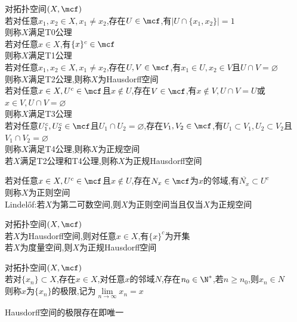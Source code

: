 \begin{dingyi}
对拓扑空间$(X,\mcf)$\\
若对任意$x_1,x_2\in X,x_1\neq x_2$,存在$U\in\mcf$,有$|U\cap\{x_1,x_2\}|=1$\\
则称$X$满足T0公理\\
若对任意$x\in X$,有$\{x\}^{c}\in\mcf$\\
则称$X$满足T1公理\\
若对任意$x_1,x_2\in X,x_1\neq x_2$,存在$U,V\in\mcf$,有$x_1\in U,x_2\in V$且$U\cap V=\varnothing$\\
则称$X$满足T2公理,则称$X$为Hausdorff空间\\
若对任意$x\in X,U^{c}\in\mcf$且$x\notin U$,存在$V\in\mcf$,有$x\notin V,U\cap V=U$或$x\in V,U\cap V=\varnothing$\\
则称$X$满足T3公理\\
若对任意$U_1^{c},U_2^{c}\in\mcf$且$U_1\cap U_2=\varnothing$,存在$V_1,V_2\in\mcf$,有$U_1\subset V_1,U_2\subset V_2$且$V_1\cap V_2=\varnothing$\\
则称$X$满足T4公理,则称$X$为正规空间\\
若$X$满足T2公理和T4公理,则称$X$为正规Hausdorff空间
\end{dingyi}

\begin{zhu}
若对任意$x\in X,U^{c}\in\mcf$且$x\notin U$,存在$N_{x}\in\mcf$为$x$的邻域,有$\overline{N_{x}}\subset U^{c}$\\
则称$X$为正则空间\\
Lindel\H{o}f:若$X$为第二可数空间,则$X$为正则空间当且仅当$X$为正规空间
\end{zhu}

\begin{dingli}
对拓扑空间$(X,\mcf)$\\
若$X$为Hausdorff空间,则对任意$x\in X$,有$\{x\}^{c}$为开集\\
若$X$为度量空间,则$X$为正规Hausdorff空间
\end{dingli}

\begin{dingyi}
对拓扑空间$(X,\mcf)$\\
若对$\{x_n\}\subset X$,存在$x\in X$,对任意$x$的邻域$N$,存在$n_0\in\N^*$,若$n\geq n_0$,则$x_n\in N$\\
则称$x$为$\{x_n\}$的极限,记为$\lim\limits_{n\to\infty}x_n=x$
\end{dingyi}

\begin{zhu}
Hausdorff空间的极限存在即唯一
\end{zhu}

